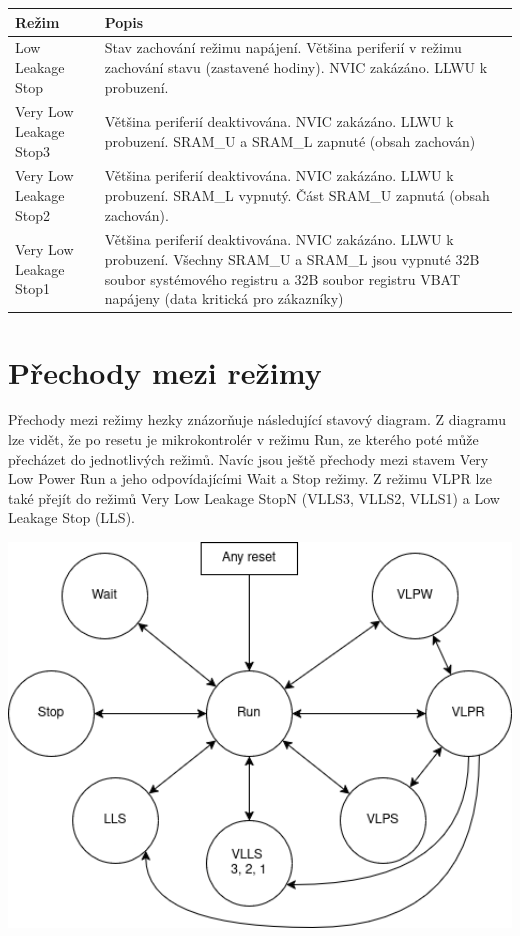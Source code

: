 \documentclass{article}
\begin{document}
\begin{tabularx}{\textwidth}{|>{\centering\arraybackslash}p{}|X|}
    \hline
    \textbf{Režim} & \textbf{Popis} \\
    \hline
    Low Leakage Stop & Stav zachování režimu napájení. Většina periferií v
    režimu zachování stavu (zastavené hodiny). NVIC zakázáno. LLWU k probuzení.
    \\
    \hline
    Very Low Leakage Stop3 & Většina periferií deaktivována. NVIC zakázáno.
    LLWU k probuzení. SRAM\_U a SRAM\_L zapnuté (obsah zachován) \\
    \hline
    Very Low Leakage Stop2 & Většina periferií deaktivována. NVIC zakázáno.
    LLWU k probuzení. SRAM\_L vypnutý. Část SRAM\_U zapnutá (obsah zachován).\\
    \hline
    Very Low Leakage Stop1 & Většina periferií deaktivována. NVIC zakázáno.
    LLWU k probuzení. Všechny SRAM\_U a SRAM\_L jsou vypnuté 32B soubor
    systémového registru a 32B soubor registru VBAT napájeny (data kritická
    pro zákazníky) \\
    \hline
\end{tabularx}

\newpage

\section{Přechody mezi režimy}

Přechody mezi režimy hezky znázorňuje následující stavový diagram. Z diagramu
lze vidět, že po resetu je mikrokontrolér v režimu Run, ze kterého poté může
přecházet do jednotlivých režimů. Navíc jsou ještě přechody mezi stavem Very
Low Power Run a jeho odpovídajícími Wait a Stop režimy. Z režimu VLPR lze také
přejít do režimů Very Low Leakage StopN (VLLS3, VLLS2, VLLS1) a Low Leakage
Stop (LLS).

\includegraphics[width=1.0\textwidth]{power-modes.png}
\end{document}
